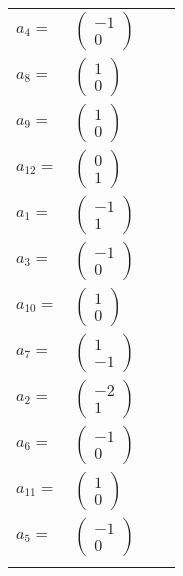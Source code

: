 \documentclass[1p]{elsarticle_modified}
\theoremstyle{definition}
\begin{document}
\begin{tabular}{m{7pt} m{180pt} m{7pt} m{180pt} }
\flushright $a_{4}=$&$\begin{pmatrix}-1\\0\end{pmatrix}$ \\
\flushright $a_{8}=$&$\begin{pmatrix}1\\0\end{pmatrix}$ \\
\flushright $a_{9}=$&$\begin{pmatrix}1\\0\end{pmatrix}$ \\
\flushright $a_{12}=$&$\begin{pmatrix}0\\1\end{pmatrix}$ \\
\flushright $a_{1}=$&$\begin{pmatrix}-1\\1\end{pmatrix}$ \\
\flushright $a_{3}=$&$\begin{pmatrix}-1\\0\end{pmatrix}$ \\
\flushright $a_{10}=$&$\begin{pmatrix}1\\0\end{pmatrix}$ \\
\flushright $a_{7}=$&$\begin{pmatrix}1\\-1\end{pmatrix}$ \\
\flushright $a_{2}=$&$\begin{pmatrix}-2\\1\end{pmatrix}$ \\
\flushright $a_{6}=$&$\begin{pmatrix}-1\\0\end{pmatrix}$ \\
\flushright $a_{11}=$&$\begin{pmatrix}1\\0\end{pmatrix}$ \\
\flushright $a_{5}=$&$\begin{pmatrix}-1\\0\end{pmatrix}$\\&\end{tabular}
\end{document}
